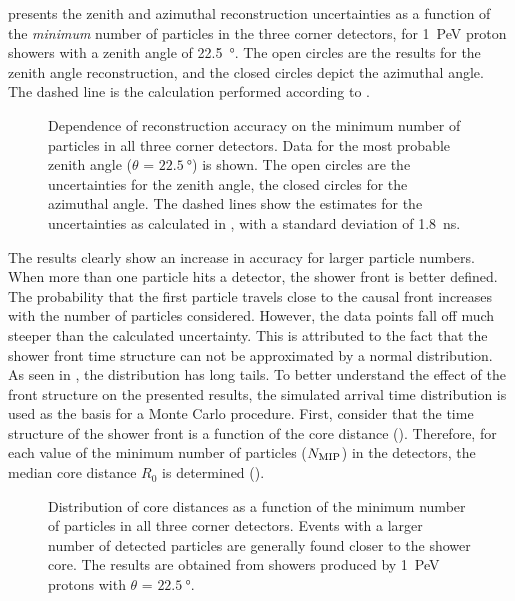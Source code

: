  presents the zenith and azimuthal reconstruction
uncertainties as a function of the \emph{minimum} number of particles in the
three corner detectors, for \SI{1}{\peta\electronvolt} proton showers with a
zenith angle of \SI{22.5}{\degree}. The open circles are the results for the
zenith angle reconstruction, and the closed circles depict the azimuthal angle.
The dashed line is the calculation performed according to
\cite{Steijger:2010-firsthit}.
\begin{figure}
\centering

\caption{Dependence of reconstruction accuracy on the minimum number of
particles in all three corner detectors.  Data for the most probable
zenith angle ($\theta$ = $\SI{22.5}{\degree}$) is shown.  The open circles
are the uncertainties for the zenith angle, the closed circles for the
azimuthal angle. The dashed lines show the estimates for the uncertainties
as calculated in \cite{Steijger:2010-firsthit}, with a standard deviation
of \SI{1.8}{\nano\second}.}
\label{fig:results-sim-mip}
\end{figure}
The results clearly show an increase in accuracy for larger particle numbers.
When more than one particle hits a detector, the shower front is better defined.
The probability that the first particle travels close to the causal front
increases with the number of particles considered. However, the data points fall
off much steeper than the calculated uncertainty.
This is attributed to the fact that the shower front time structure can not be
approximated by a normal distribution. As seen in
, the distribution has long tails. To better
understand the effect of the front structure on the presented results, the
simulated arrival time distribution is used as the basis for a Monte Carlo
procedure. First, consider that the time structure of the shower front is a
function of the core distance (). Therefore, for each
value of the minimum number of particles ($N_\mathrm{\mip}$) in the detectors,
the median core distance $R_0$ is determined ().
\begin{figure}
\centering

\caption{Distribution of core distances as a function of the minimum
number of particles in all three corner detectors.  Events with a larger
number of detected particles are generally found closer to the shower
core.  The results are obtained from showers produced by
\SI{1}{\peta\electronvolt} protons with $\theta$ = $\SI{22.5}{\degree}$.}
\label{fig:mip-core-dists}
\end{figure}

